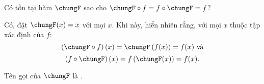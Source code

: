 \exercise Có tồn tại hàm $\chungF$ sao cho $\chungF \circ f = f \circ \chungF = f$?

\solution

Có, đặt $\chungF(x) = x$ với mọi $x$. Khi này, hiển nhiên rằng, với mọi $x$ thuộc tập xác định của $f$:
$$\left(\chungF \circ f\right)(x) = \chungF\left(f(x)\right) = f(x)~\text{và}$$
$$\left(f \circ \chungF\right)(x) = f\left(\chungF(x)\right) = f(x).$$

Tên gọi của $\chungF$ là .